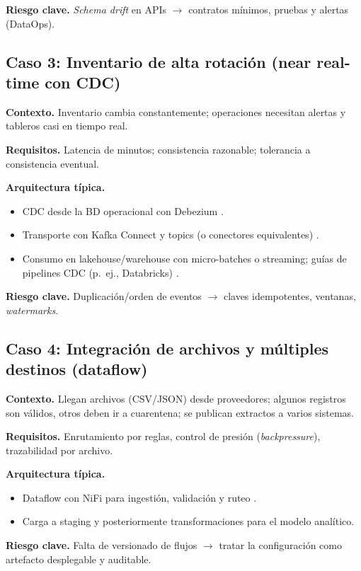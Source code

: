 \documentclass[12pt]{article}
\begin{document}
\textbf{Riesgo clave.} \textit{Schema drift} en APIs $\rightarrow$ contratos mínimos, pruebas y alertas (DataOps).

\subsection{Caso 3: Inventario de alta rotación (near real-time con CDC)}
\textbf{Contexto.} Inventario cambia constantemente; operaciones necesitan alertas y tableros casi en tiempo real.

\textbf{Requisitos.} Latencia de minutos; consistencia razonable; tolerancia a consistencia eventual.

\textbf{Arquitectura típica.}
\begin{itemize}[leftmargin=*]
  \item CDC desde la BD operacional con Debezium \cite{debezium_home}.
  \item Transporte con Kafka Connect y topics (o conectores equivalentes) \cite{kafka_connect_user_guide}.
  \item Consumo en lakehouse/warehouse con micro-batches o streaming; guías de pipelines CDC (p.\ ej., Databricks) \cite{databricks_cdc_tutorial}.
\end{itemize}

\textbf{Riesgo clave.} Duplicación/orden de eventos $\rightarrow$ claves idempotentes, ventanas, \textit{watermarks}.

\subsection{Caso 4: Integración de archivos y múltiples destinos (dataflow)}
\textbf{Contexto.} Llegan archivos (CSV/JSON) desde proveedores; algunos registros son válidos, otros deben ir a cuarentena; se publican extractos a varios sistemas.

\textbf{Requisitos.} Enrutamiento por reglas, control de presión (\textit{backpressure}), trazabilidad por archivo.

\textbf{Arquitectura típica.}
\begin{itemize}[leftmargin=*]
  \item Dataflow con NiFi para ingestión, validación y ruteo \cite{nifi_overview}.
  \item Carga a staging y posteriormente transformaciones para el modelo analítico.
\end{itemize}

\textbf{Riesgo clave.} Falta de versionado de flujos $\rightarrow$ tratar la configuración como artefacto desplegable y auditable.
\end{document}
